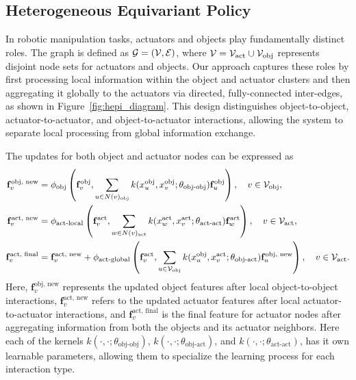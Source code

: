 \subsection{Heterogeneous Equivariant Policy}
\label{alg:hepi}

In robotic manipulation tasks, actuators and objects play fundamentally distinct roles. The graph is defined as ${\mathcal{G}} = ({\mathcal{V}}, {\mathcal{E}})$, where ${\mathcal{V}} = {\mathcal{V}}_\text{act} \cup {\mathcal{V}}_\text{obj}$ represents disjoint node sets for actuators and objects. Our approach captures these roles by first processing local information within the object and actuator clusters and then aggregating it globally to the actuators via directed, fully-connected inter-edges, as shown in Figure~\ref{fig:hepi_diagram}. This design distinguishes object-to-object, actuator-to-actuator, and object-to-actuator interactions, allowing the system to separate local processing from global information exchange.

The updates for both object and actuator nodes can be expressed as
\begin{equation}
\begin{aligned}
\mathbf{f}_v^{\text{obj, new}} &= \phi_\text{obj} \left( \mathbf{f}_v^\text{obj}, \sum_{u \in N(v)_\text{obj}} k(x^{\text{obj}}_u, x^{\text{obj}}_v; \theta_\text{obj-obj}) \mathbf{f}_u^\text{obj} \right), \quad v \in {\mathcal{V}}_\text{obj}, \\
\mathbf{f}_v^{\text{act, new}} &= \phi_\text{act-local} \left( \mathbf{f}_v^\text{act}, \sum_{w \in N(v)_\text{act}} k(x^{\text{act}}_w, x^{\text{act}}_v; \theta_\text{act-act}) \mathbf{f}_w^\text{act} \right), \quad v \in {\mathcal{V}}_\text{act}, \\
\mathbf{f}_v^{\text{act, final}} &= \mathbf{f}_v^{\text{act, new}} + \phi_\text{act-global} \left( \mathbf{f}_v^{\text{act}}, \sum_{u \in {\cal V}_\text{obj}} k(x^{\text{obj}}_u, x^{\text{act}}_v; \theta_\text{obj-act}) \mathbf{f}_u^{\text{obj, new}} \right), \quad v \in {\mathcal{V}}_\text{act}.
\end{aligned}
\label{hepi_update}
\end{equation}
Here, $\mathbf{f}_v^{\text{obj, new}}$ represents the updated object features after local object-to-object interactions, $\mathbf{f}_v^{\text{act, new}}$ refers to the updated actuator features after local actuator-to-actuator interactions, and $\mathbf{f}_v^{\text{act, final}}$ is the final feature for actuator nodes after aggregating information from both the objects and its actuator neighbors. Here each of the kernels $k(\cdot, \cdot; \theta_\text{obj-obj})$, $k(\cdot, \cdot; \theta_\text{obj-act})$, and $k(\cdot, \cdot; \theta_\text{act-act})$, has it own learnable parameters, allowing them to specialize the learning process for each interaction type.

